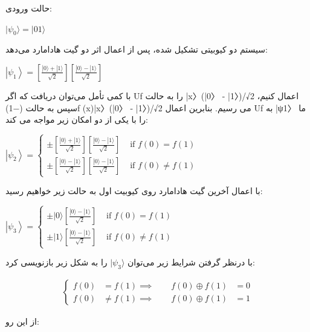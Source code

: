 \documentclass{book}
\begin{document}
\newpage

حالت ورودی:\\
\begin{center}
	$\vert\psi_{0}\rangle = \vert01\rangle$
\end{center}

سیستم دو کیوبیتی تشکیل شده،‌ پس از اعمال اثر دو گیت هادامارد می‌دهد:\\

\begin{center}
$\left|\psi_1\right\rangle=\left[\frac{|0\rangle+|1\rangle}{\sqrt{2}}\right]\left[\frac{|0\rangle-|1\rangle}{\sqrt{2}}\right]$
\end{center}
با کمی تأمل می‌توان دریافت که اگر Uf را به حالت |x〉(|0〉 - |1〉)/√2 اعمال کنیم، سپس به حالت (−1)f (x)|x〉(|0〉 - |1〉)/√2 می رسیم. بنابرین اعمال Uf به |ψ1〉 ما را با یکی از دو امکان زیر مواجه می کند:
\begin{center}
	$\left|\psi_2\right\rangle= \begin{cases} \pm\left[\frac{|0\rangle+|1\rangle}{\sqrt{2}}\right]\left[\frac{|0\rangle-|1\rangle}{\sqrt{2}}\right] & \text { if } f(0)=f(1) \\ \pm\left[\frac{|0\rangle-|1\rangle}{\sqrt{2}}\right]\left[\frac{|0\rangle-|1\rangle}{\sqrt{2}}\right] & \text { if } f(0) \neq f(1) \end{cases}$
\end{center}
با اعمال آخرین گیت هادامارد روی کیوبیت اول به حالت زیر خواهیم رسید:
\begin{center}
	$\left|\psi_3\right\rangle= \begin{cases} \pm|0\rangle\left[\frac{|0\rangle-|1\rangle}{\sqrt{2}}\right] & \text { if } f(0)=f(1) \\ \pm|1\rangle\left[\frac{|0\rangle-|1\rangle}{\sqrt{2}}\right] & \text { if } f(0) \neq f(1) \end{cases}$
\end{center}
با درنظر گرفتن شرایط زیر می‌توان $\vert\psi_{3}\rangle$ را به شکل زیر بازنویسی کرد:

$$
\begin{aligned}
	\left\{
	\begin{aligned}
		f(0) &= f(1) 
		\implies \qquad f(0) \oplus f(1) &= 0\\
		f(0) &\neq f(1) 
		\implies \qquad f(0) \oplus f(1) &= 1
	\end{aligned}
	\right.
\end{aligned}$$

از این رو:
\end{document}
